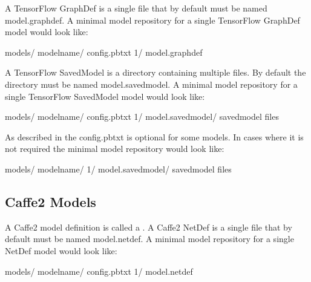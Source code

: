 \documentclass[letterpaper,10pt,english]{sphinxmanual}
\begin{document}
A TensorFlow GraphDef is a single file that by default must be named
model.graphdef. A minimal model repository for a single TensorFlow
GraphDef model would look like:

\begin{sphinxVerbatim}[commandchars=\\\{\}]
models/
  \PYGZlt{}model\PYGZhy{}name\PYGZgt{}/
    config.pbtxt
    1/
      model.graphdef
\end{sphinxVerbatim}

A TensorFlow SavedModel is a directory containing multiple files. By
default the directory must be named model.savedmodel. A minimal model
repository for a single TensorFlow SavedModel model would look like:

\begin{sphinxVerbatim}[commandchars=\\\{\}]
models/
  \PYGZlt{}model\PYGZhy{}name\PYGZgt{}/
    config.pbtxt
    1/
      model.savedmodel/
         \PYGZlt{}saved\PYGZhy{}model files\PYGZgt{}
\end{sphinxVerbatim}

As described in {\hyperref[\detokenize{model_configuration:section-generated-model-configuration}]{}} the
config.pbtxt is optional for some models. In cases where it is not
required the minimal model repository would look like:

\begin{sphinxVerbatim}[commandchars=\\\{\}]
models/
  \PYGZlt{}model\PYGZhy{}name\PYGZgt{}/
    1/
      model.savedmodel/
         \PYGZlt{}saved\PYGZhy{}model files\PYGZgt{}
\end{sphinxVerbatim}


\subsection{Caffe2 Models}
\label{\detokenize{model_repository:caffe2-models}}
A Caffe2 model definition is called a . A Caffe2 NetDef is a
single file that by default must be named model.netdef. A minimal
model repository for a single NetDef model would look like:

\begin{sphinxVerbatim}[commandchars=\\\{\}]
models/
  \PYGZlt{}model\PYGZhy{}name\PYGZgt{}/
    config.pbtxt
    1/
      model.netdef
\end{sphinxVerbatim}
\end{document}
